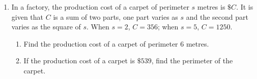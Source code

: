 \documentclass[11pt]{article}
\begin{document}
\begin{enumerate}
            \hrulefill
            
            \hrulefill

            \hrulefill

            \hrulefill
            
            \hrulefill
            
            \hrulefill
            
            \hrulefill
            
            \hrulefill
            
            \hrulefill
            
            \hrulefill
            
            \hrulefill
            
            \hrulefill
            
            \hrulefill
            
            \hrulefill

        \pagebreak
        \item In a factory, the production cost of a carpet of perimeter $s$ metres is $\$C$. It is given that $C$ is a sum of two parts, one part varies as $s$ and the second part varies as the square of $s$. When $s=2$, $C=356$; when $s=5$, $C=1250$.\begin{enumerate}
            \item Find the production cost of a carpet of perimeter 6 metres.
            \item If the production cost of a carpet is $\$539$, find the perimeter of the carpet.
        \end{enumerate}

        \hrulefill

            \hrulefill
            
            \hrulefill
            
            \hrulefill
            
            \hrulefill
            
            \hrulefill
            
            \hrulefill
            
            \hrulefill
            
            \hrulefill
            
            \hrulefill
            
            \hrulefill
            
            \hrulefill


\end{enumerate}
\end{document}
